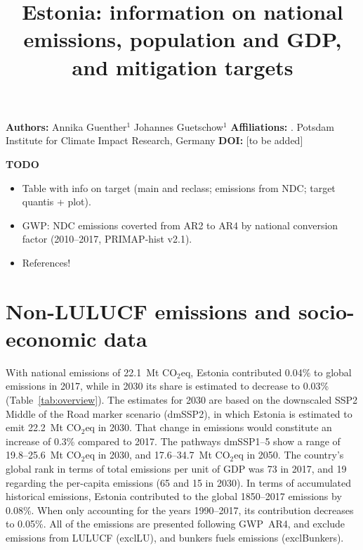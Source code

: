\documentclass[12pt]{article}
\title{ \bfseries \color{PIKorange} Estonia: information on national emissions, population and GDP, and mitigation targets}
\begin{document}
 \maketitle

 \noindent \textbf{Authors:} \newline
 \indent Annika Guenther$^{1}$ \newline
 \indent Johannes Guetschow$^{1}$ \newline
 \noindent \textbf{Affiliations:} \newline
 . Potsdam Institute for Climate Impact Research, Germany \newline
 \noindent \textbf{DOI:} [to be added] \newline

 \textbf{TODO}
 \begin{itemize}
 \item Table with info on target (main and reclass; emissions from NDC; target quantis + plot).
 \item GWP: NDC emissions coverted from AR2 to AR4 by national conversion factor (2010--2017, PRIMAP-hist v2.1).
 \item References!
 \end{itemize}

 \newpage %
 \section{Non-LULUCF emissions and socio-economic data}
 \label{sec:nonLULUCFSocioEco}
 With national emissions of 22.1~Mt CO$_2$eq, Estonia contributed 0.04\% to global emissions in 2017, while in 2030 its share is estimated to decrease to 0.03\% (Table~\ref{tab:overview}).
 The estimates for 2030 are based on the downscaled SSP2 Middle of the Road marker scenario (dmSSP2), in which Estonia is estimated to emit 22.2~Mt CO$_2$eq in 2030.
 That change in emissions would constitute an increase of 0.3\% compared to 2017. 
 The pathways dmSSP1--5 show a range of 19.8--25.6~Mt CO$_2$eq in 2030, and 17.6--34.7~Mt CO$_2$eq in 2050.
 The country's global rank in terms of total emissions per unit of GDP was 73 in 2017, and 19 regarding the per-capita emissions (65 and 15 in 2030).
 In terms of accumulated historical emissions, Estonia contributed to the global 1850--2017 emissions by 0.08\%. 
 When only accounting for the years 1990--2017, its contribution decreases to 0.05\%.
 All of the emissions are presented following GWP~AR4, and exclude emissions from LULUCF (exclLU), and bunkers fuels emissions (exclBunkers).
\end{document}
